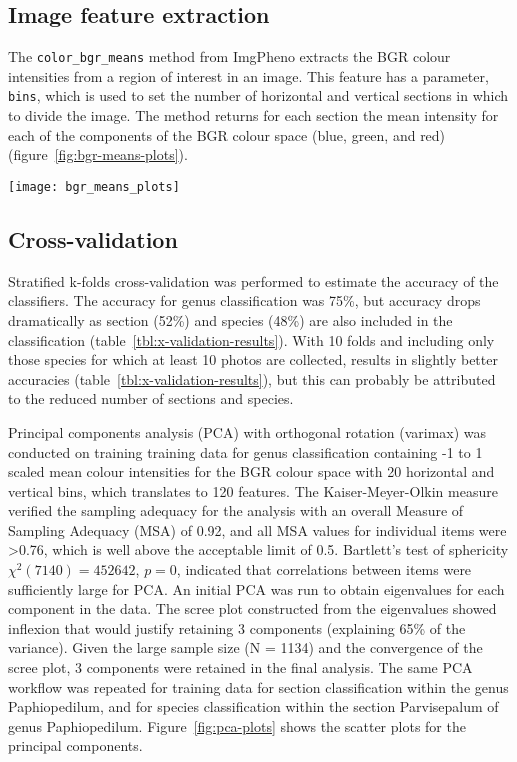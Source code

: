\documentclass[review,3p,twocolumn]{elsarticle}
\begin{document}
\subsection{Image feature extraction}

The \verb/color_bgr_means/ method from ImgPheno extracts the BGR colour intensities from a region of interest in an image. This feature has a parameter, \verb/bins/, which is used to set the number of horizontal and vertical sections in which to divide the image. The method returns for each section the mean intensity for each of the components of the BGR colour space (blue, green, and red) (figure~\ref{fig:bgr-means-plots}).

\begin{figure*}[t]
    \centering
    \texttt{[image: bgr\_means\_plots]}
    \caption{Plots of the mean BGR colour intensities for an image of \textit{P. druryi}. The plots display the mean intensities for the horizontal and vertical bins respectively.}
    \label{fig:bgr-means-plots}
\end{figure*}

\subsection{Cross-validation}

Stratified k-folds cross-validation was performed to estimate the accuracy of the classifiers. The accuracy for genus classification was 75\%, but accuracy drops dramatically as section (52\%) and species (48\%) are also included in the classification (table~\ref{tbl:x-validation-results}). With 10 folds and including only those species for which at least 10 photos are collected, results in slightly better accuracies (table~\ref{tbl:x-validation-results}), but this can probably be attributed to the reduced number of sections and species.

Principal components analysis (PCA) with orthogonal rotation (varimax) was conducted on training training data for genus classification containing -1 to 1 scaled mean colour intensities for the BGR colour space with 20 horizontal and vertical bins, which translates to 120 features. The Kaiser-Meyer-Olkin measure verified the sampling adequacy for the analysis with an overall Measure of Sampling Adequacy (MSA) of 0.92, and all MSA values for individual items were >0.76, which is well above the acceptable limit of 0.5. Bartlett's test of sphericity $\chi^2 (7140) = 452642$, $p = 0$, indicated that correlations between items were sufficiently large for PCA. An initial PCA was run to obtain eigenvalues for each component in the data. The scree plot constructed from the eigenvalues showed inflexion that would justify retaining 3 components (explaining 65\% of the variance). Given the large sample size (N = 1134) and the convergence of the scree plot, 3 components were retained in the final analysis. The same PCA workflow was repeated for training data for section classification within the genus Paphiopedilum, and for species classification within the section Parvisepalum of genus Paphiopedilum. Figure~\ref{fig:pca-plots} shows the scatter plots for the principal components.
\end{document}
